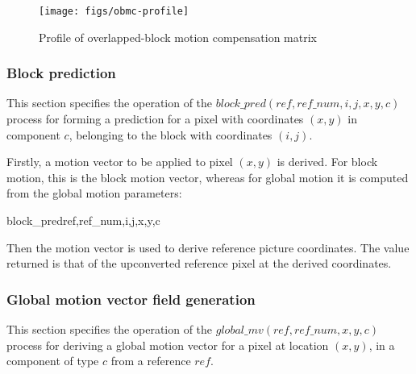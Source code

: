 \begin{figure}[!ht]
\centering
\texttt{[image: figs/obmc-profile]}
\caption{Profile of overlapped-block motion compensation matrix}
\label{fig:weightprofile}
\end{figure}

\subsubsection{Block prediction}
\label{blockprediction}

This section specifies the operation of the $block\_pred(ref, ref\_num, i, j, x, y, c)$ 
process for forming a prediction for a pixel 
with coordinates $(x,y)$ in component $c$, belonging to the block with coordinates $(i,j)$.

Firstly, a motion vector to be applied to pixel $(x,y)$ is derived. For block motion, this is
the block motion vector, whereas for global motion it is computed from the global motion 
parameters:

\begin{pseudo}{block\_pred}{ref,ref\_num,i,j,x,y,c}
\bsIF{\BlockData[j][i][global]==\false}
\bsELSE
\bsEND
{}
\bsEND
\bsCODE{\hdots}
\end{pseudo}

Then the motion vector is used to derive reference picture coordinates.
The value returned is that of the upconverted reference pixel at the derived coordinates.

\begin{pseudo*}
\bsELSE
\bsEND
{}
\end{pseudo*}

\subsubsection{Global motion vector field generation}
\label{globalmv}

This section specifies the operation of the $global\_mv(ref, ref\_num, x,y, c)$ process
for deriving a global motion vector for a pixel at location $(x,y)$, in a component of 
type $c$ from a reference $ref$.

